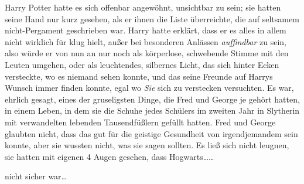 \later

Harry Potter hatte es sich offenbar angewöhnt, unsichtbar zu sein; sie hatten seine Hand nur kurz gesehen, als er ihnen die Liste überreichte, die auf seltsamem nicht-Pergament geschrieben war. Harry hatte erklärt, dass er es alles in allem nicht wirklich für klug hielt, außer bei besonderen Anlässen \emph{auffindbar} zu sein, also würde er von nun an nur noch als körperlose, schwebende Stimme mit den Leuten umgehen, oder als leuchtendes, silbernes Licht, das sich hinter Ecken versteckte, wo es niemand sehen konnte, und das seine Freunde auf Harrys Wunsch immer finden konnte, egal wo \emph{Sie} sich zu verstecken versuchten. Es war, ehrlich gesagt, eines der gruseligsten Dinge, die Fred und George je gehört hatten, in einem Leben, in dem sie die Schuhe jedes Schülers im zweiten Jahr in Slytherin mit verwandelten lebenden Tausendfüßlern gefüllt hatten. Fred und George glaubten nicht, dass das gut für die geistige Gesundheit von irgendjemandem sein konnte, aber sie wussten nicht, was sie sagen sollten. Es ließ sich nicht leugnen, sie hatten mit eigenen 4 Augen gesehen, dass Hogwarts……

nicht sicher war…

